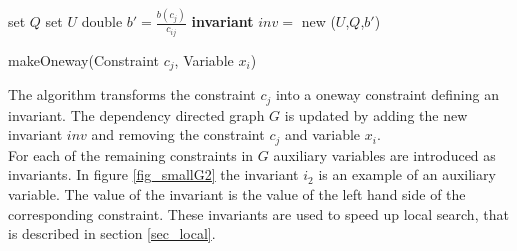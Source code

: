 \IncMargin{1em}
\begin{algorithm}[H]
\algdata
{}
\BlankLine
set $Q$ 
set $U$ 
double $b' = \frac{b(c_j)}{c_{ij}}$ \; 
 \;
\textbf{invariant} $inv = $ new \Sum($U$,$Q$,$b'$)\; 

 \caption{makeOneway(\textsf{Constraint} $c_j$, \textsf{Variable} $x_i$)} \label{algo_makeoneway}
\end{algorithm}\DecMargin{1em} \noindent
The algorithm transforms the constraint $c_j$ into a oneway constraint defining an invariant. The dependency directed 
graph $G$ is updated by adding the new invariant $inv$ and removing the constraint $c_j$ and variable $x_i$. \medskip 
\\ 
For each of the remaining constraints in $G$ auxiliary variables are introduced as invariants. In figure 
\ref{fig_smallG2} the invariant $i_2$ is an example of an auxiliary variable. The value of the invariant is the value 
of the left hand side of the corresponding constraint. These invariants are used to speed up local search, that is 
described in section \ref{sec_local}. \\


